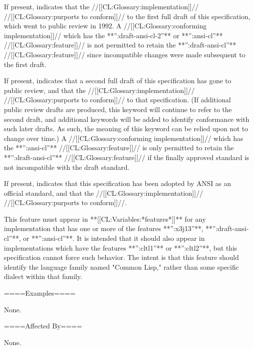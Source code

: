 
If present, indicates that the //[[CL:Glossary:implementation]]// //[[CL:Glossary:purports to conform]]// to the first full draft of this specification, which went to public review in 1992. A //[[CL:Glossary:conforming implementation]]// which has the **'':draft-ansi-cl-2''** or **'':ansi-cl''** //[[CL:Glossary:feature]]// is not permitted to retain the **'':draft-ansi-cl''** //[[CL:Glossary:feature]]// since incompatible changes were made subsequent to the first draft.


If present, indicates that a second full draft of this specification has gone to public review, and that the //[[CL:Glossary:implementation]]// //[[CL:Glossary:purports to conform]]// to that specification. (If additional public review drafts are produced, this keyword will continue to refer to the second draft, and additional keywords will be added to identify conformance with such later drafts. As such, the meaning of this keyword can be relied upon not to change over time.) A //[[CL:Glossary:conforming implementation]]// which has the **'':ansi-cl''** //[[CL:Glossary:feature]]// is only permitted to retain the **'':draft-ansi-cl''** //[[CL:Glossary:feature]]// if the finally approved standard is not incompatible with the draft standard.


If present, indicates that this specification has been adopted by ANSI as an official standard, and that the //[[CL:Glossary:implementation]]// //[[CL:Glossary:purports to conform]]//.


This feature must appear in **[[CL:Variables:*features*]]** for any implementation that has one or more of the features **'':x3j13''**, **'':draft-ansi-cl''**, or **'':ansi-cl''**. It is intended that it should also appear in implementations which have the features **'':cltl1''** or **'':cltl2''**, but this specification cannot force such behavior. The intent is that this feature should identify the language family named "Common Lisp," rather than some specific dialect within that family.

\endlist

====Examples====

None.

====Affected By====

None.

